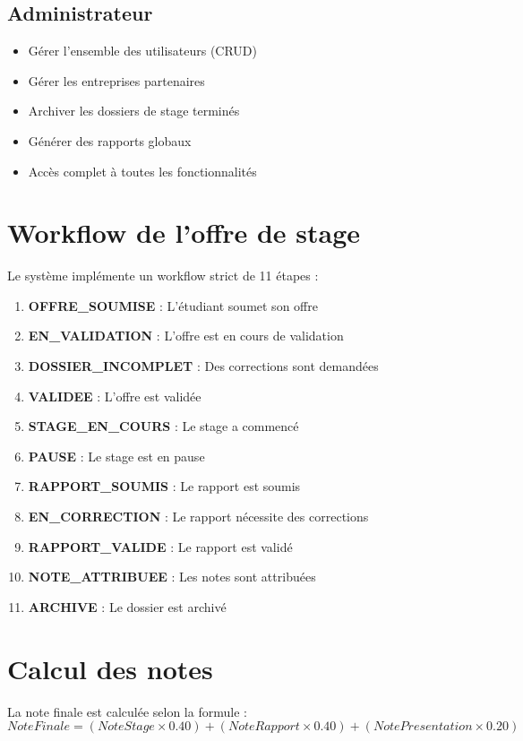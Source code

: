 \documentclass[12pt,a4paper]{report}
\begin{document}
\subsection{Administrateur}
\begin{itemize}
    \item Gérer l'ensemble des utilisateurs (CRUD)
    \item Gérer les entreprises partenaires
    \item Archiver les dossiers de stage terminés
    \item Générer des rapports globaux
    \item Accès complet à toutes les fonctionnalités
\end{itemize}

\section{Workflow de l'offre de stage}
Le système implémente un workflow strict de 11 étapes :
\begin{enumerate}
    \item \textbf{OFFRE\_SOUMISE} : L'étudiant soumet son offre
    \item \textbf{EN\_VALIDATION} : L'offre est en cours de validation
    \item \textbf{DOSSIER\_INCOMPLET} : Des corrections sont demandées
    \item \textbf{VALIDEE} : L'offre est validée
    \item \textbf{STAGE\_EN\_COURS} : Le stage a commencé
    \item \textbf{PAUSE} : Le stage est en pause
    \item \textbf{RAPPORT\_SOUMIS} : Le rapport est soumis
    \item \textbf{EN\_CORRECTION} : Le rapport nécessite des corrections
    \item \textbf{RAPPORT\_VALIDE} : Le rapport est validé
    \item \textbf{NOTE\_ATTRIBUEE} : Les notes sont attribuées
    \item \textbf{ARCHIVE} : Le dossier est archivé
\end{enumerate}

\section{Calcul des notes}
La note finale est calculée selon la formule :
\begin{equation}
NoteFinale = (NoteStage \times 0.40) + (NoteRapport \times 0.40) + (NotePresentation \times 0.20)
\end{equation}
\end{document}
